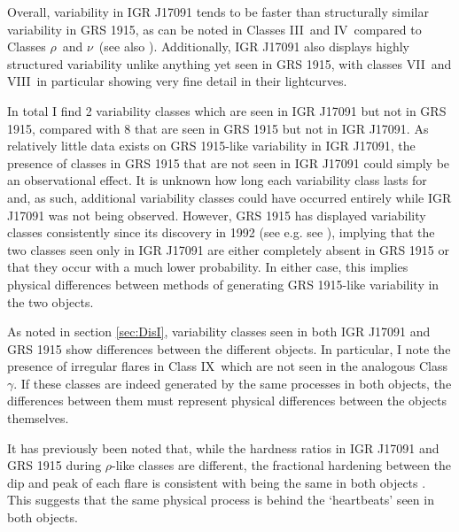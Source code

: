 \par Overall, variability in IGR J17091 tends to be faster than structurally similar variability in GRS 1915, as can be noted in Classes III\indexiii\ and IV\indexiv\ compared to Classes $\rho$\indexrho\ and $\nu$\indexnu\ (see also \citealp{Altamirano_IGR_FH}).  Additionally, IGR J17091 also displays highly structured variability unlike anything yet seen in GRS 1915, with classes VII\indexvii\ and VIII\indexviii\ in particular showing very fine detail in their lightcurves.
\par In total I find 2 variability classes which are seen in IGR J17091 but not in GRS 1915, compared with 8 that are seen in GRS 1915 but not in IGR J17091.  As relatively little data exists on GRS 1915-like variability in IGR J17091, the presence of classes in GRS 1915 that are not seen in IGR J17091 could simply be an observational effect.  It is unknown how long each variability class lasts for and, as such, additional variability classes could have occurred entirely while IGR J17091 was not being observed.  However, GRS 1915 has displayed variability classes consistently since its discovery in 1992 (see e.g. see \citealp{Huppenkothen_ML}), implying that the two classes seen only in IGR J17091 are either completely absent in GRS 1915 or that they occur with a much lower probability.  In either case, this implies physical differences between methods of generating GRS 1915-like variability in the two objects.  
\par As noted in section \ref{sec:DisI}, variability classes seen in both IGR J17091 and GRS 1915 show differences between the different objects.  In particular, I note the presence of irregular flares in Class IX\indexix\ which are not seen in the analogous Class $\gamma$\indexgamma.  If these classes are indeed generated by the same processes in both objects, the differences between them must represent physical differences between the objects themselves.
\par It has previously been noted that, while the hardness ratios in IGR J17091 and GRS 1915 during $\rho$\indexrho-like classes are different, the fractional hardening between the dip and peak of each flare is consistent with being the same in both objects \citep{Capitanio_peculiar}.  This suggests that the same physical process is behind the `heartbeats' seen in both objects.
